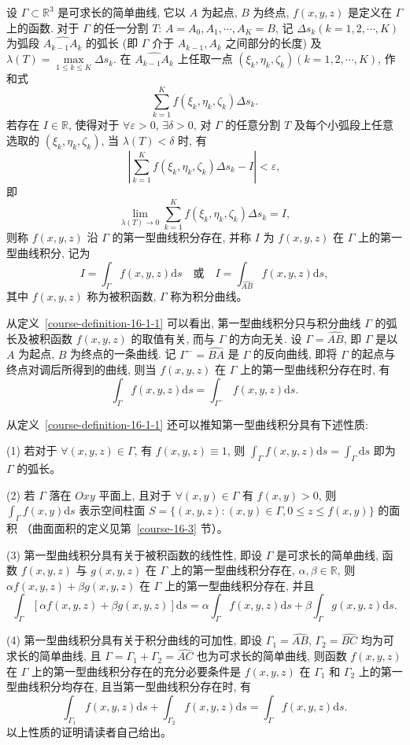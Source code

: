 \documentclass[UTF8,12pt,a4paper,fontset=fandol]{ctexart}
\begin{document}
\begin{definition}\label{course-definition-16-1-1}\quad 设 $\Gamma\subset\mathbb R^3$ 是可求长的简单曲线, 它以 $A$ 为起点, $B$ 为终点, $f(x,y,z)$ 是定义在 $\Gamma$ 上的函数. 对于 $\Gamma$ 的任一分割 $T$: $A=A_0,A_1,\cdots,A_K=B$, 记 $\Delta s_k(k=1,2,\cdots,K)$ 为弧段 $\widehat{A_{k-1}A_k}$ 的弧长 (即 $\Gamma$ 介于 $A_{k-1},A_k$ 之间部分的长度) 及 $\lambda(T)=\max\limits_{1\leqslant k\leqslant K}\Delta s_k$. 在 $\widehat{A_{k-1}A_k}$ 上任取一点 $(\xi_k,\eta_k,\zeta_k)(k=1,2,\cdots,K)$, 作和式
\[
  \sum_{k=1}^K f(\xi_k,\eta_k,\zeta_k)\Delta s_k.
\]
若存在 $I\in\mathbb R$, 使得对于 $\forall\varepsilon>0$, $\exists\delta>0$, 对 $\Gamma$ 的任意分割 $T$ 及每个小弧段上任意选取的 $(\xi_k,\eta_k,\zeta_k)$, 当 $\lambda(T)<\delta$ 时, 有
\[
  \left|\sum_{k=1}^K f(\xi_k,\eta_k,\zeta_k)\Delta s_k-I\right|<\varepsilon,
\]
即
\[
  \lim_{\lambda(T)\to0}\sum_{k=1}^K f(\xi_k,\eta_k,\zeta_k)\Delta s_k=I,
\]
则称 $f(x,y,z)$ 沿 $\Gamma$ 的第一型曲线积分存在, 并称 $I$ 为 $f(x,y,z)$ 在 $\Gamma$ 上的第一型曲线积分, 记为
\[
  I=\int_\Gamma f(x,y,z)\mathrm ds
  \quad\text{或}\quad
  I=\int_{\widehat{AB}} f(x,y,z)\mathrm ds,
\]
其中 $f(x,y,z)$ 称为被积函数, $\Gamma$ 称为积分曲线。

从定义~\ref{course-definition-16-1-1}  可以看出, 第一型曲线积分只与积分曲线 $\Gamma$ 的弧长及被积函数 $f(x,y,z)$ 的取值有关, 而与 $\Gamma$ 的方向无关. 设 $\Gamma=\widehat{AB}$, 即 $\Gamma$ 是以 $A$ 为起点, $B$ 为终点的一条曲线. 记 $\Gamma^-=\widehat{BA}$ 是 $\Gamma$ 的反向曲线, 即将 $\Gamma$ 的起点与终点对调后所得到的曲线, 则当 $f(x,y,z)$ 在 $\Gamma$ 上的第一型曲线积分存在时, 有
\[
  \int_\Gamma f(x,y,z)\mathrm ds=\int_{\Gamma^-} f(x,y,z)\mathrm ds.
\]

从定义~\ref{course-definition-16-1-1}  还可以推知第一型曲线积分具有下述性质:

(1) 若对于 $\forall(x,y,z)\in\Gamma$, 有 $f(x,y,z)\equiv1$, 则 $\int_\Gamma f(x,y,z)\mathrm ds=\int_\Gamma \mathrm ds$ 即为 $\Gamma$ 的弧长。

(2) 若 $\Gamma$ 落在 $Oxy$ 平面上, 且对于 $\forall(x,y)\in\Gamma$ 有 $f(x,y)>0$, 则 $\int_\Gamma f(x,y)\mathrm ds$ 表示空间柱面 $S=\{(x,y,z):(x,y)\in\Gamma,0\leqslant z\leqslant f(x,y)\}$ 的面积 （曲面面积的定义见第~\ref{course-16-3} 节）。

(3) 第一型曲线积分具有关于被积函数的线性性, 即设 $\Gamma$ 是可求长的简单曲线, 函数 $f(x,y,z)$ 与 $g(x,y,z)$ 在 $\Gamma$ 上的第一型曲线积分存在, $\alpha,\beta\in\mathbb R$, 则 $\alpha f(x,y,z)+\beta g(x,y,z)$ 在 $\Gamma$ 上的第一型曲线积分存在, 并且
\[
  \int_\Gamma [\alpha f(x,y,z)+\beta g(x,y,z)]\mathrm ds
  =\alpha\int_\Gamma f(x,y,z)\mathrm ds
  +\beta\int_\Gamma g(x,y,z)\mathrm ds.
\]

(4) 第一型曲线积分具有关于积分曲线的可加性, 即设 $\Gamma_1=\widehat{AB}$, $\Gamma_2=\widehat{BC}$ 均为可求长的简单曲线, 且 $\Gamma=\Gamma_1+\Gamma_2=\widehat{AC}$ 也为可求长的简单曲线, 则函数 $f(x,y,z)$ 在 $\Gamma$ 上的第一型曲线积分存在的充分必要条件是 $f(x,y,z)$ 在 $\Gamma_1$ 和 $\Gamma_2$ 上的第一型曲线积分均存在, 且当第一型曲线积分存在时, 有
\[
  \int_{\Gamma_1} f(x,y,z)\mathrm ds+\int_{\Gamma_2} f(x,y,z)\mathrm ds
  =\int_\Gamma f(x,y,z)\mathrm ds.
\]
以上性质的证明请读者自己给出。

\end{definition}
\end{document}
